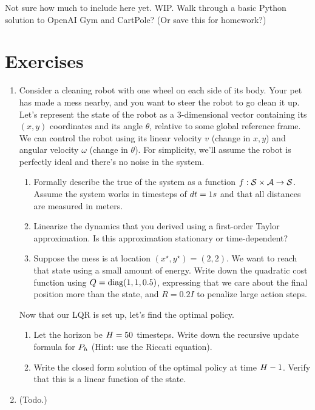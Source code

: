 \documentclass[\main/main]{subfiles}
\begin{document}
    Not sure how much to include here yet. WIP. Walk through a basic Python solution
    to OpenAI Gym and CartPole? (Or save this for homework?)
\fi

\iffalse
    \section{Exercises}

    \begin{enumerate}
        \item Consider a cleaning robot with one wheel on each side of its body. Your pet has made a mess nearby, and you want to steer the robot to go clean it up.
              Let's represent the state of the robot as a $3$-dimensional vector containing its $(x, y)$ coordinates and its angle $\theta$, relative to some global reference frame.
              We can control the robot using its linear velocity $v$ (change in $x, y$) and angular velocity $\omega$ (change in $\theta$).
              For simplicity, we'll assume the robot is perfectly ideal and there's no noise in the system.
              \begin{enumerate}
                  \item Formally describe the true of the system as a function $f : \mathcal{S} \times \mathcal{A} \to \mathcal{S}$. Assume the system works in timesteps of $dt = 1 s$ and that all distances are measured in meters.
                  \item Linearize the dynamics that you derived using a first-order Taylor approximation. Is this approximation stationary or time-dependent?
                  \item Suppose the mess is at location $(x^\star, y^\star) = (2, 2)$. We want to reach that state using a small amount of energy. Write down the quadratic cost function using $Q = \operatorname*{\textrm{diag}}(1, 1, 0.5)$, expressing that we care about the final position more than the state, and $R = 0.2 I$ to penalize large action steps.
              \end{enumerate}
              Now that our LQR is set up, let's find the optimal policy.
              \begin{enumerate}
                  \item Let the horizon be $H = 50$ timesteps. Write down the recursive update formula for $P_h$ (Hint: use the Riccati equation).
                  \item Write the closed form solution of the optimal policy at time $H-1$. Verify that this is a linear function of the state.
              \end{enumerate}

        \item (Todo.)


    \end{enumerate}
\end{document}
